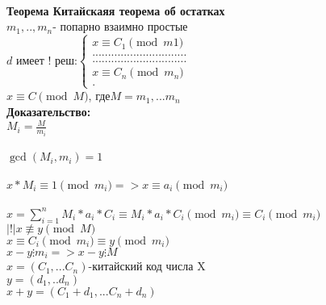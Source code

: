 \documentclass[12pt]{article}
\begin{document}
\\
\textbf{Теорема Китайскаяя теорема об остатках}
\\
$m_1,..,m_n $- попарно взаимно простые \\

$
d \text{ имеет ! реш:}\left\{
\begin{aligned}
x \equiv C_1 \pmod{m1}\\
..............................\\
..............................\\
x \equiv C_n \pmod{m_n}\\.
\end{aligned}
\right.
$\\
$x\equiv C\pmod{M} $, где$M = m_1,...m_n$\\

\textbf{Доказательство:}\\ 
$M_i=\frac{M}{m_i}$\\
\\
$\gcd(M_i, m_i) = 1 $\\
\\
$x*M_i\equiv 1\pmod{m_i} => x\equiv a_i\pmod{m_i} $\\
\\
$x = \sum_{i=1}^{n} M_i*a_i*C_i\equiv M_i*a_i*C_i\pmod{m_i}\equiv C_i\pmod{m_i} $\\
$|!| x \not\equiv y \pmod{M} $\\
$x\equiv C_i\pmod{m_i}\equiv y\pmod{m_i}$\\
$x-y\vdots m_i => x-y\vdots M$\\
$x = (C_1,...C_n)$-китайский код числа X\\
$y = (d_1,..d_n)$\\
$x+y = (C_1+d_1,...C_n+d_n)$
\end{document}
